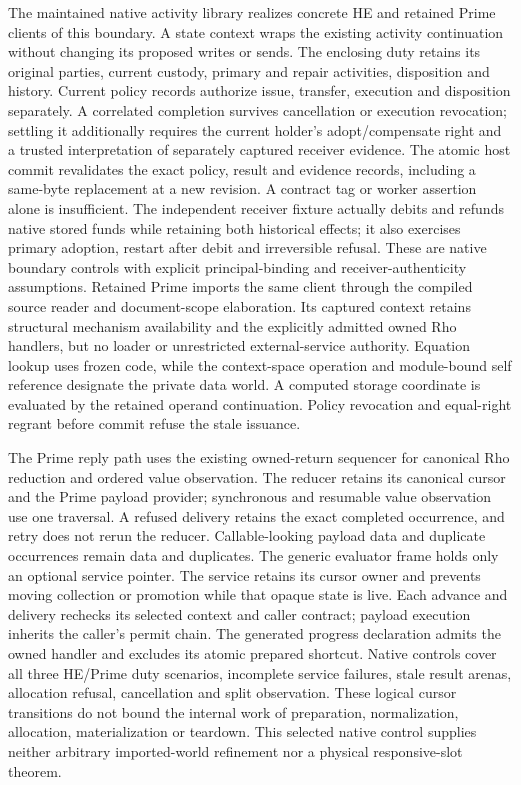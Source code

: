 \documentclass[11pt]{article}
\theoremstyle{definition}
\theoremstyle{remark}
\begin{document}
The maintained native activity library realizes concrete HE and retained Prime
clients of this boundary. A state context wraps the existing activity continuation without
changing its proposed writes or sends. The enclosing duty retains its original
parties, current custody, primary and repair activities, disposition and
history. Current policy records authorize issue, transfer, execution and
disposition separately. A correlated completion survives cancellation or
execution revocation; settling it additionally requires the current holder's
adopt/compensate right and a trusted interpretation of separately captured
receiver evidence. The atomic host commit revalidates the exact policy,
result and evidence records, including a same-byte replacement at a new
revision. A contract tag or worker assertion alone is insufficient.
The independent receiver fixture actually debits and refunds native stored
funds while retaining both historical effects; it also exercises primary
adoption, restart after debit and irreversible refusal. These are native
boundary controls with explicit principal-binding and receiver-authenticity
assumptions. Retained Prime imports the same client through the compiled source
reader and document-scope elaboration. Its captured context retains structural
mechanism availability and the explicitly admitted owned Rho handlers, but no
loader or unrestricted external-service authority. Equation lookup uses frozen
code, while the context-space operation and module-bound self reference
designate the private data world. A computed storage coordinate is evaluated by
the retained operand continuation. Policy revocation and equal-right regrant
before commit refuse the stale issuance.

The Prime reply path uses the existing owned-return sequencer for canonical
Rho reduction and ordered value observation. The reducer retains its canonical
cursor and the Prime payload provider; synchronous and resumable value
observation use one traversal. A refused delivery retains the exact completed
occurrence, and retry does not rerun the reducer. Callable-looking payload data
and duplicate occurrences remain data and duplicates. The generic evaluator
frame holds only an optional service pointer. The service retains its cursor
owner and prevents moving collection or promotion while that opaque state is
live. Each advance and delivery rechecks its selected context and caller
contract; payload execution inherits the caller's permit chain. The generated
progress declaration admits the owned handler and excludes its atomic prepared
shortcut. Native controls cover all three HE/Prime duty scenarios, incomplete
service failures, stale result arenas, allocation refusal, cancellation and
split observation. These logical cursor transitions do not bound the internal
work of preparation, normalization, allocation, materialization or teardown.
This selected native control supplies neither arbitrary imported-world
refinement nor a physical responsive-slot theorem.
\end{document}
